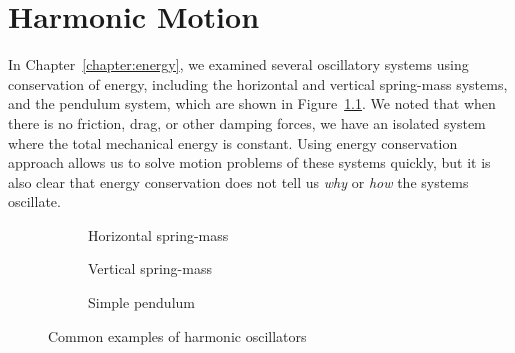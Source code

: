 \chapter{Harmonic Motion}
\label{chapter:harmonic-motion}


In Chapter~\ref{chapter:energy}, we examined several oscillatory systems using
conservation of energy, including the horizontal and vertical spring-mass
systems, and the pendulum system, which are shown in
Figure~\ref{fig:shm-systems}. We noted that when there is no friction, drag, or
other damping forces, we have an isolated system where the total mechanical
energy is constant. Using energy conservation approach allows us to solve
motion problems of these systems quickly, but it is also clear that energy
conservation does not tell us \emph{why} or \emph{how} the systems oscillate.
\begin{figure}[ht]
  \centering
  \begin{subfigure}{.3\textwidth}
    \centering
    \caption{Horizontal spring-mass}
  \end{subfigure}
  \hspace{\stretch1}
  \begin{subfigure}{.3\textwidth}
    \centering
    \caption{Vertical spring-mass}
  \end{subfigure}
  \hspace{\stretch1}
  \begin{subfigure}{.3\textwidth}
    \centering
   \caption{Simple pendulum}
  \end{subfigure}
  \caption{Common examples of harmonic oscillators}
  \label{fig:shm-systems}
\end{figure}


